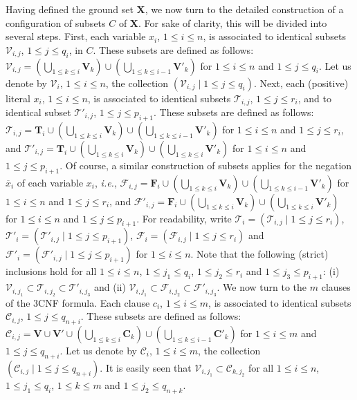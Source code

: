 \documentclass[a4paper,10pt]{llncs}
\begin{document}
Having defined the ground set $\mathbf{X}$, 
we now turn to the detailed construction of a configuration of subsets $C$ of $\mathbf{X}$. 
For sake of clarity, this will be divided into several steps. 
First, each variable $x_i$, $1 \leq i \leq n$, is associated to identical subsets 
$\mathcal{V}_{i, j}$, $1 \leq j \leq q_i$, in $C$. These subsets are defined as follows:
$\mathcal{V}_{i, j} = 
\left( \bigcup_{1 \leq k \leq i} \mathbf{V}_k \right) \cup 
\left( \bigcup_{1 \leq k \leq i-1} \mathbf{V}'_k \right)$
for $1 \leq i \leq n$ and $1 \leq j \leq q_i$.
Let us denote by $\mathcal{V}_i$, $1 \leq i \leq n$, 
the collection $(\mathcal{V}_{i, j} \mid 1 \leq j \leq q_i)$.
Next, each (positive) literal $x_i$, $1 \leq i \leq n$, 
is associated to identical subsets $\mathcal{T}_{i, j}$, $1 \leq j \leq r_i$, 
and to identical subset $\mathcal{T}'_{i, j}$, $1 \leq j \leq p_{i + 1}$. 
These subsets are defined as follows:
$\mathcal{T}_{i, j} = \mathbf{T}_i \cup 
\left( \bigcup_{1 \leq k \leq i} \mathbf{V}_k \right) \cup 
\left( \bigcup_{1 \leq k \leq i-1} \mathbf{V}'_k \right)$
for $1 \leq i \leq n$ and $1 \leq j \leq r_i$, and
$\mathcal{T}'_{i, j} = \mathbf{T}_i \cup \left( 
\bigcup_{1 \leq k \leq i} \mathbf{V}_k \right) \cup 
\left( \bigcup_{1 \leq k \leq i} \mathbf{V}'_k \right)$
for $1 \leq i \leq n$ and $1 \leq j \leq p_{i+1}$.
Of course, a similar construction of subsets applies for the negation 
$\overline{x}_i$ of each variable $x_i$, \emph{i.e.},
$\mathcal{F}_{i, j} = 
\mathbf{F}_i \cup \left( \bigcup_{1 \leq k \leq i} 
\mathbf{V}_k \right) \cup \left( \bigcup_{1 \leq k \leq i-1} 
\mathbf{V}'_k \right)$ for $1 \leq i \leq n$ and $1 \leq j \leq r_i$, and
$\mathcal{F}'_{i, j} = \mathbf{F}_i \cup \left( 
\bigcup_{1 \leq k \leq i} \mathbf{V}_k \right) \cup 
\left( \bigcup_{1 \leq k \leq i} \mathbf{V}'_k \right)$ 
for $1 \leq i \leq n$ and $1 \leq j \leq p_{i+1}$.
For readability, write 
$\mathcal{T}_i = (\mathcal{T}_{i, j} \mid 1 \leq j \leq r_i)$, 
$\mathcal{T}'_i = (\mathcal{T}'_{i, j} \mid 1 \leq j \leq p_{i+1})$, 
$\mathcal{F}_i = (\mathcal{F}_{i, j} \mid 1 \leq j \leq r_i)$ and 
$\mathcal{F}'_i = (\mathcal{F}'_{i, j} \mid 1 \leq j \leq p_{i+1})$ for $1 \leq i \leq n$. 
Note that the following (strict) inclusions hold for all $1 \leq i \leq n$, 
$1 \leq j_1 \leq q_i$, $1 \leq j_2 \leq r_i$ and $1 \leq j_3 \leq p_{i+1}$: 
(i) $\mathcal{V}_{i, j_1} \subset \mathcal{T}_{i, j_2} \subset \mathcal{T}'_{i, j_3}$ and 
(ii) $\mathcal{V}_{i, j_1} \subset \mathcal{F}_{i, j_2} \subset \mathcal{F}'_{i, j_3}$.
We now turn to the $m$ clauses of the $3$CNF formula. 
Each clause $c_i$, $1 \leq i \leq m$, is associated to identical subsets 
$\mathcal{C}_{i, j}$, $1 \leq j \leq q_{n+i}$. These subsets are defined as follows:
$\mathcal{C}_{i, j} = \mathbf{V} \cup \mathbf{V}' \cup 
\left( \bigcup_{1 \leq k \leq i} \mathbf{C}_k \right) 
\cup \left( \bigcup_{1 \leq k \leq i-1} \mathbf{C}'_k \right)$
for $1 \leq i \leq m$ and $1 \leq j \leq q_{n+i}$.
Let us denote by $\mathcal{C}_i$, $1 \leq i \leq m$, 
the collection $(\mathcal{C}_{i, j} \mid 1 \leq j \leq q_{n+i})$. 
It is easily seen that $\mathcal{V}_{i, j_1} \subset \mathcal{C}_{k, j_2}$ 
for all $1 \leq i \leq n$, $1 \leq j_1 \leq q_i$, $1 \leq k \leq m$ and 
$1 \leq j_2 \leq q_{n+k}$.
\end{document}
